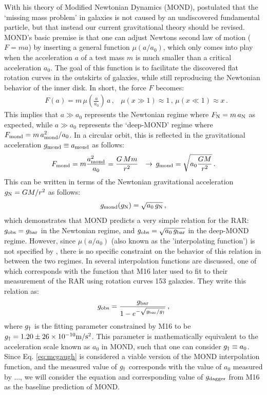 \documentclass[fleqn,usenatbib]{mnras}
\newcommand*{\E}[1]{\times 10^{#1}}
\newcommand{\un}[1]{_{\rm #1}}
\begin{document}
With his theory of Modified Newtonian Dynamics (MOND), \cite{milgrom1983} postulated that the `missing mass problem' in galaxies is not caused by an undiscovered fundamental particle, but that instead our current gravitational theory should be revised. MOND's basic premise is that one can adjust Newtons second law of motion ($F=ma$) by inserting a general function $\mu(a/a_0)$, which only comes into play when the acceleration $a$ of a test mass $m$ is much smaller than a critical acceleration $a_0$. The goal of this function is to facilitate the discovered flat rotation curves in the outskirts of galaxies, while still reproducing the Newtonian behavior of the inner disk. In short, the force $F$ becomes:
\begin{align}\label{eq:mond_f}
	& F(a) = m \, \mu(\frac{a}{a_0}) \, a \, ,
	& \mu(x \gg 1) \approx 1 \, , \, \mu(x \ll 1) \approx x \, .
\end{align}
This implies that $a\gg a_0$ represents the Newtonian regime where $F\un{N} = m \, a\un{N}$ as expected, while $a\gg a_0$ represents the `deep-MOND' regime where $F\un{mond}=m \, a\un{mond}^2/a_0$. In a circular orbit, this is reflected in the gravitational acceleration $g\un{mond} \equiv a\un{mond}$ as follows:
\begin{align}\label{eq:mond_g}
	& F\un{mond} = m \frac{a\un{mond}^2}{a_0} = \frac{G \, M m}{r^2}
	& \rightarrow \,  g\un{mond} = \sqrt{a_0 \frac{G M}{r^2}} \, .
\end{align}
This can be written in terms of the Newtonian gravitational acceleration $g\un{N}=GM/r^2$ as follows:
\begin{equation}
	g\un{mond}(g\un{N}) = \sqrt{a_0 \, g\un{N}} \, ,
\end{equation}
which demonstrates that MOND predicts a very simple relation for the RAR: $g\un{obs}=g\un{bar}$ in the Newtonian regime, and $g\un{obs}=\sqrt{a_0 \, g\un{bar}}$ in the deep-MOND regime. However, since $\mu(a/a_0)$ (also known as the 'interpolating function') is not specified by \cite{milgrom1983}, there is no specific constraint on the behavior of this relation in between the two regimes. In \cite{milgrom2008} several interpolation functions are discussed, one of which corresponds with the function that M16 later used to fit to their measurement of the RAR using rotation curves 153 galaxies. They write this relation as:
\begin{equation}\label{eq:mcgaugh}
	g\un{obs} = \frac{g\un{bar}}{1 - e^{-\sqrt{g\un{bar}/g\un{\dagger}}}} \, ,
\end{equation}
where $g\un{\dagger}$ is the fitting parameter constrained by M16 to be $g\un{\dagger}=1.20\pm26\E{-10} {\rm m/s^2}$. This parameter is mathematically equivalent to the acceleration scale known as $a_0$ in MOND, such that one can consider $g\un{\dagger}\equiv a_0$. Since Eq. \ref{eq:mcgaugh} is considered a viable version of the MOND interpolation function, and the measured value of $g\un{\dagger}$ corresponds with the value of $a_0$ measured by ..., we will consider the equation and corresponding value of $g\un{dagger}$ from M16 as the baseline prediction of MOND.
\end{document}
